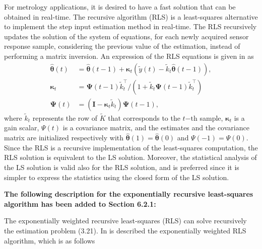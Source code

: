 \documentclass[11pt]{article}
\begin{document}
\begin{itemize}
    For metrology applications, it is desired to have a fast solution that can be obtained in real-time. 
    The recursive algorithm (RLS) is a least-squares alternative to implement the step input estimation method in real-time.
    The RLS recursively updates the solution of the system of equations, for each newly acquired sensor response sample, considering the previous value of the estimation, instead of performing a matrix inversion.
    An expression of the RLS equations is given in \cite{Kailath00book} as
    \begin{equation} \tag{3.24} \begin{aligned} \widehat{\bm{\theta}}(t) &= \widehat{\bm{\theta}}(t-1) + \bm{\kappa}_{t} \left( \widetilde{y}(t) - \widetilde{k}_{t} \widehat{\bm{\theta}}(t-1) \right) , \\  \bm{\kappa}_{t} &= \bm{\Psi}(t-1) \widetilde{k}_{t}^\top / \left( 1 + \widetilde{k}_{t} \bm{\Psi}(t-1) \widetilde{k}_{t}^\top  \right) \\ \bm{\Psi}(t) &= \left( \mathbf{I} - \bm{\kappa}_{t} \widetilde{k}_{t} \right) \bm{\Psi}(t-1), \label{eqn:RLS} \end{aligned} \end{equation}
    where $\widetilde{k}_{t}$ represents the row of $\widetilde{K}$ that corresponds to the $t\mathrm{-th}$ sample, $\bm{\kappa}_{t}$ is a gain scalar, $\Psi(t)$ is a covariance matrix, and the estimates and the covariance matrix are initialized respectively with $\widehat{\bm{\theta}}(1)= \widehat{\bm{\theta}}(0)$ and $\Psi(-1) = \Psi(0)$.
    Since the RLS is a recursive implementation of the least-squares computation, the RLS solution is equivalent to the LS solution.
    Moreover, the statistical analysis of the LS solution is valid also for the RLS solution, and is preferred since it is simpler to express the statistics using the closed form of the LS solution.    
    \color{black}	
    
    {\bfseries The following description for the exponentially recursive least-squares algorithm has been added to Section 6.2.1:}    

    \color{blue}
    The exponentially weighted recursive least-squares (RLS) can solve recursively the estimation problem (3.21).
    In \cite{Kailath00book} is described the exponentially weighted RLS algorithm, which is as follows


\end{itemize}
\end{document}

